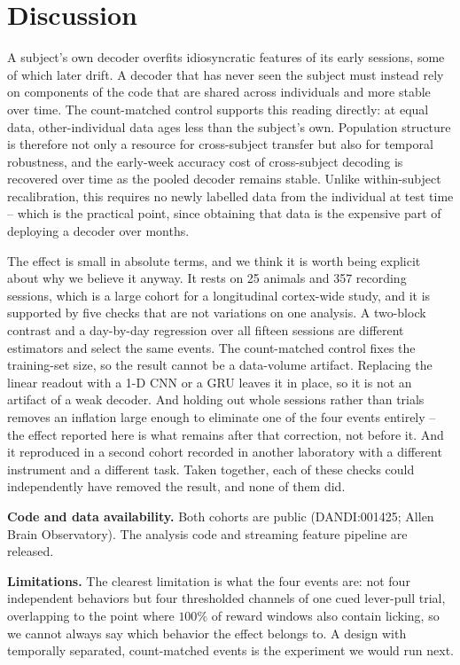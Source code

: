 \documentclass{article}
\begin{document}
\section{Discussion}
A subject's own decoder overfits idiosyncratic features of its early sessions, some of which later
drift. A decoder that has never seen the subject must instead rely on components of the code that are
shared across individuals and more stable over time. The count-matched control supports this reading
directly: at equal data, other-individual data ages less than the subject's own. Population structure
is therefore not only a resource for cross-subject transfer but also for temporal robustness, and the
early-week accuracy cost of cross-subject decoding is recovered over time as the pooled decoder
remains stable. Unlike within-subject recalibration, this requires no newly labelled data from the
individual at test time -- which is the practical point, since obtaining that data is the expensive
part of deploying a decoder over months.

The effect is small in absolute terms, and we think it is worth being explicit about why we believe
it anyway. It rests on 25 animals and 357 recording sessions, which is a large cohort for a
longitudinal cortex-wide study, and it is supported by five checks that are not variations on one
analysis. A two-block contrast and a day-by-day regression over all fifteen sessions are different
estimators and select the same events. The count-matched control fixes the training-set size, so the
result cannot be a data-volume artifact. Replacing the linear readout with a 1-D CNN or a GRU leaves
it in place, so it is not an artifact of a weak decoder. And holding out whole sessions rather than
trials removes an inflation large enough to eliminate one of the four events entirely -- the effect
reported here is what remains after that correction, not before it. And it reproduced in a second
cohort recorded in another laboratory with a different instrument and a different task.
Taken together, each of these checks could independently have removed the result, and none of them
did.


\textbf{Code and data availability.} Both cohorts are public (DANDI:001425; Allen Brain
Observatory). The analysis code and streaming feature pipeline are released.

\textbf{Limitations.} The clearest limitation is what the four events are: not four independent
behaviors but four thresholded channels of one cued lever-pull trial, overlapping to the point where
$100\%$ of reward windows also contain licking, so we cannot always say which behavior the effect
belongs to. A design with temporally separated, count-matched events is the experiment we would run
next.
\end{document}
